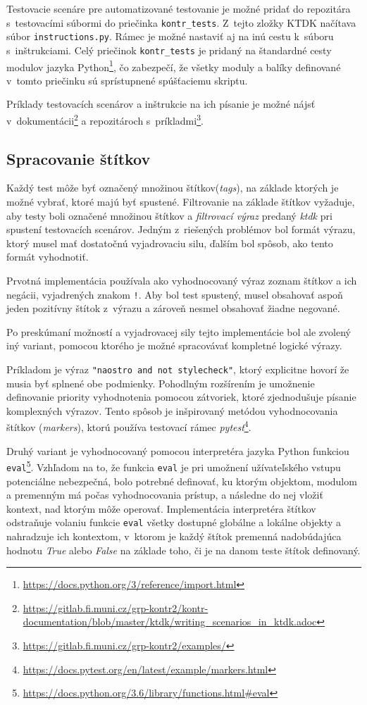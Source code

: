 \documentclass[
  digital, %
  oneside, %
  table,   %
  lof,     %
  lot,   %
]{fithesis3}
\newcommand*{\footurl}[1]{\footnote{\url{#1}}}
\begin{document}
Testovacie scenáre pre automatizované testovanie je možné pridať do repozitára s~testovacími súbormi do priečinka \texttt{kontr\_tests}. Z~tejto zložky KTDK načítava súbor \texttt{instructions.py}. Rámec je možné nastaviť aj na inú cestu k~súboru s~inštrukciami. Celý priečinok \texttt{kontr\_tests} je pridaný na štandardné cesty modulov jazyka Python\footnote{\url{https://docs.python.org/3/reference/import.html}}, čo zabezpečí, že všetky moduly a balíky definované v~tomto priečinku sú sprístupnené spúšťaciemu skriptu.

Príklady testovacích scenárov a inštrukcie na ich písanie je možné nájsť v~dokumentácii\footnote{\url{https://gitlab.fi.muni.cz/grp-kontr2/kontr-documentation/blob/master/ktdk/writing_scenarios_in_ktdk.adoc}} a repozitároch s~príkladmi\footnote{\url{https://gitlab.fi.muni.cz/grp-kontr2/examples/}}. 

\subsection{Spracovanie štítkov}

Každý test môže byť označený množinou štítkov(\emph{tags}), na základe ktorých je možné vybrať, ktoré majú byť spustené. Filtrovanie na základe štítkov vyžaduje, aby testy boli označené množinou štítkov a \emph{filtrovací výraz} predaný \emph{ktdk} pri spustení testovacích scenárov. Jedným z~riešených problémov bol formát výrazu, ktorý musel mať dostatočnú vyjadrovaciu silu, ďalším bol spôsob, ako tento formát vyhodnotiť. 

Prvotná implementácia používala ako vyhodnocovaný výraz zoznam štítkov a ich negácii, vyjadrených znakom \texttt{!}. Aby bol test spustený, musel obsahovať aspoň jeden pozitívny štítok z~výrazu a zároveň nesmel obsahovať žiadne negované.

Po preskúmaní možností a vyjadrovacej sily tejto implementácie bol ale zvolený iný variant, pomocou ktorého je možné spracovávať kompletné logické výrazy.

Príkladom je výraz \texttt{"naostro and not stylecheck"}, ktorý explicitne hovorí že musia byť splnené obe podmienky. Pohodlným rozšírením je umožnenie definovanie priority vyhodnotenia pomocou zátvoriek, ktoré zjednodušuje písanie komplexných výrazov. Tento spôsob je inšpirovaný metódou vyhodnocovania štítkov (\emph{markers}), ktorú používa testovací rámec \emph{pytest}\footurl{https://docs.pytest.org/en/latest/example/markers.html}.

Druhý variant je vyhodnocovaný pomocou interpretéra jazyka Python funkciou \texttt{eval}\footurl{https://docs.python.org/3.6/library/functions.html\#eval}. Vzhľadom na to, že funkcia \texttt{eval} je pri umožnení užívateľského vstupu potenciálne nebezpečná, bolo potrebné definovať, ku ktorým objektom, modulom a premenným má počas vyhodnocovania prístup, a následne do nej vložiť kontext, nad ktorým môže operovať. Implementácia interpretéra štítkov odstraňuje volaniu funkcie \texttt{eval} všetky dostupné globálne a lokálne objekty a nahradzuje ich kontextom, v~ktorom je každý štítok premenná nadobúdajúca hodnotu \emph{True} alebo \emph{False} na základe toho, či je na danom teste štítok definovaný. 
\end{document}
